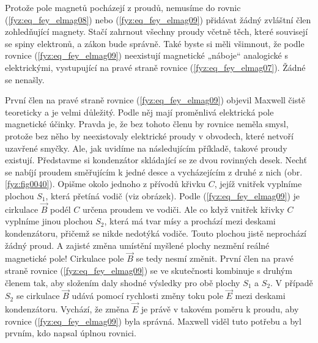     Protože pole magnetů pocházejí z proudů, nemusíme do rovnic (\ref{fyz:eq_fey_elmag08}) nebo
    (\ref{fyz:eq_fey_elmag09}) přidávat žádný zvláštní člen zohledňující magnety. Stačí zahrnout 
    všechny proudy včetně těch, které souvisejí se spiny elektronů, a zákon bude správně. Také 
    byste si měli všimnout, že podle rovnice (\ref{fyz:eq_fey_elmag09}) neexistují magnetické 
    „náboje“ analogické s elektrickými, vystupující na pravé straně rovnice 
    (\ref{fyz:eq_fey_elmag07}). Žádné se nenašly.


    První člen na pravé straně rovnice (\ref{fyz:eq_fey_elmag09}) objevil Maxwell čistě teoreticky 
    a je velmi důležitý. Podle něj mají proměnlivá elektrická pole magnetické účinky. Pravda je, že 
    bez tohoto členu by rovnice neměla smysl, protože bez něho by neexistovaly elektrické proudy v 
    obvodech, které netvoří uzavřené smyčky. Ale, jak uvidíme na následujícím příkladě, takové 
    proudy existují. Představme si kondenzátor skládající se ze dvou rovinných desek. Nechť se 
    nabíjí proudem směřujícím k jedné desce a vycházejícím z druhé z nich (obr. 
    \ref{fyz:fig0040}). Opišme okolo jednoho z přívodů křivku \(C\), jejíž vnitřek vyplníme 
    plochou \(S_1\), která přetíná vodič (viz obrázek). Podle (\ref{fyz:eq_fey_elmag09}) je 
    cirkulace \(\vec{B}\) podél \(C\) určena proudem ve vodiči. Ale co když vnitřek křivky \(C\) 
    vyplníme jinou plochou \(S_2\), která má tvar mísy a prochází mezi deskami kondenzátoru, 
    přičemž se nikde nedotýká vodiče. Touto plochou jistě neprochází žádný proud. A zajisté 
    změna umístění myšlené plochy nezmění reálné magnetické pole! Cirkulace pole \(\vec{B}\) se 
    tedy nesmí změnit. První člen na pravé straně rovnice (\ref{fyz:eq_fey_elmag09}) se ve 
    skutečnosti kombinuje s druhým členem tak, aby složením daly shodné výsledky pro obě plochy 
    \(S_1\) a \(S_2\). V případě \(S_2\) se cirkulace \(\vec{B}\) udává pomocí rychlosti změny toku 
    pole \(\vec{E}\) mezi deskami kondenzátoru. Vychází, že změna \(\vec{E}\) je právě v takovém 
    poměru k proudu, aby rovnice (\ref{fyz:eq_fey_elmag09}) byla správná. Maxwell viděl tuto 
    potřebu a byl prvním, kdo napsal úplnou rovnici.

      
